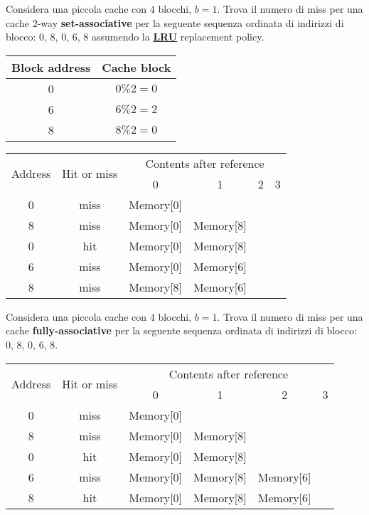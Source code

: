 \begin{example}
	Considera una piccola cache con $4$ blocchi, $b=1$. Trova il numero di miss per una cache 2-way \textbf{set-associative} per la seguente sequenza ordinata di indirizzi di blocco: 0, 8, 0, 6, 8 assumendo la \textbf{\hyperref[lru]{LRU}} replacement policy.
	\begin{table}[h]
		\centering
		\begin{tabular}{|c|c|}
			\hline
			Block address & Cache block \\
			\hline
			0 & $0 \% 2=0$ \\
			6 & $6\% 2= 2$\\
			8 & $8\%2=0$\\
			\hline
		\end{tabular}
	\end{table}
	\begin{table}[!h]
		\centering
		\begin{tabular}{|c|c|c|c|c|c|}
			\hline
			\multirow{2}{*}{Address} & \multirow{2}{*}{Hit or miss} & \multicolumn{4}{c|}{Contents after reference} \\
			& & 0 & 1 & 2 & 3 \\
			\hline
			0 & miss & Memory[0] & & &\\
			8 & miss & Memory[0] & Memory[8] & &\\
			0 & hit & Memory[0] & Memory[8]& &\\
			6 & miss & Memory[0] & Memory[6]&&\\
			8 & miss & Memory[8] & Memory[6]& &\\
			\hline
		\end{tabular}
	\end{table}
\end{example}

\begin{example}
	Considera una piccola cache con $4$ blocchi, $b=1$. Trova il numero di miss per una cache \textbf{fully-associative} per la seguente sequenza ordinata di indirizzi di blocco: 0, 8, 0, 6, 8.
	\begin{table}[!h]
		\centering
		\begin{tabular}{|c|c|c|c|c|c|}
			\hline
			\multirow{2}{*}{Address} & \multirow{2}{*}{Hit or miss} & \multicolumn{4}{c|}{Contents after reference} \\
			& & 0 & 1 & 2 & 3 \\
			\hline
			0 & miss & Memory[0] & & &\\
			8 & miss & Memory[0] & Memory[8] & &\\
			0 & hit & Memory[0] & Memory[8]& &\\
			6 & miss & Memory[0] & Memory[8]&Memory[6]&\\
			8 & hit & Memory[0] & Memory[8]&Memory[6] &\\
			\hline
		\end{tabular}
	\end{table}
\end{example}


